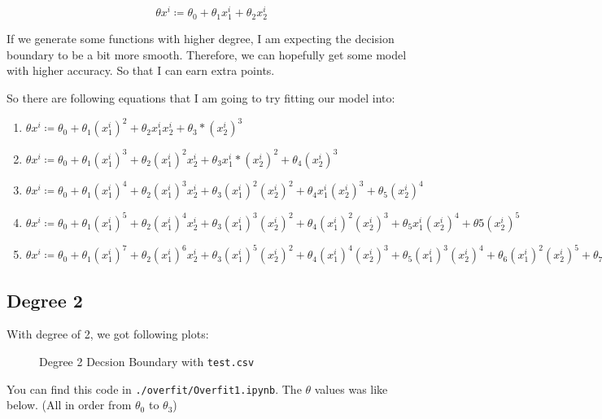 \documentclass{homework}
\begin{document}
\[
    \theta x^i \coloneqq \theta_0 + \theta_1 x_1^i + \theta_2 x_2^i
\]

If we generate some functions with higher degree, I am expecting the decision boundary to be a bit more smooth. Therefore, we can hopefully get some model with higher accuracy. So that I can earn extra points.

So there are following equations that I am going to try fitting our model into:

\begin{enumerate}
  \item $\theta x^i \coloneqq \theta_0 + \theta_1 (x_1^i)^2 + \theta_2 x_1^i x_2^i + \theta_3 * (x_2^i)^3$
  \item $\theta x^i \coloneqq \theta_0 + \theta_1 (x_1^i)^3 + \theta_2 (x_1^i)^2 x_2^i + \theta_3 x_1^i * (x_2^i)^2 + \theta_4 (x_2^i)^3$
  \item $\theta x^i \coloneqq \theta_0 + \theta_1 (x_1^i)^4 + \theta_2 (x_1^i)^3 x_2^i + \theta_3 (x_1^i)^2 (x_2^i)^2 + \theta_4 x_1^i (x_2^i)^3 + \theta_5 (x_2^i)^4$
  \item $\theta x^i \coloneqq \theta_0 + \theta_1 (x_1^i)^5 + \theta_2 (x_1^i)^4 x_2^i + \theta_3 (x_1^i)^3 (x_2^i)^2 + \theta_4 (x_1^i)^2 (x_2^i)^3 + \theta_5 x_1^i(x_2^i)^4 + \theta5 (x_2^i)^5$
  \item $\theta x^i \coloneqq \theta_0 + \theta_1 (x_1^i)^7 + \theta_2 (x_1^i)^6 x_2^i + \theta_3 (x_1^i)^5 (x_2^i)^2 + \theta_4 (x_1^i)^4 (x_2^i)^3 + \theta_5 (x_1^i)^3 (x_2^i)^4 + \theta_6 (x_1^i)^2 (x_2^i)^5 + \theta_7 (x_1^i)^1 (x_2^i)^6 + \theta_7 (x_2^i)^7$
\end{enumerate}

\pagebreak

\subsection{Degree 2}
With degree of 2, we got following plots:

\begin{figure}[h]
    \begin{center}
        \resizebox{0.5\textwidth}{!}{}
    \end{center}
    \caption{Degree 2 Decsion Boundary with \texttt{test.csv}}
\end{figure}

You can find this code in \texttt{./overfit/Overfit1.ipynb}. The $\theta$ values was like below. (All in order from $\theta_0$ to $\theta_3$)
\end{document}
